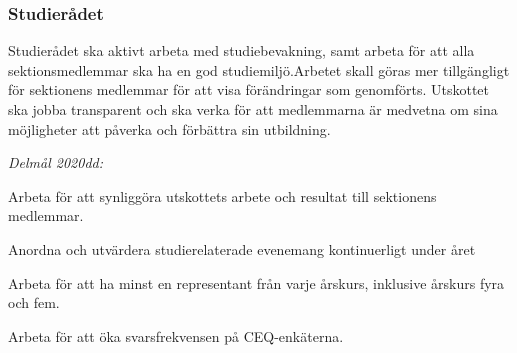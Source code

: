 \documentclass[../_main/handlingar.tex]{subfiles}
\begin{document}
\subsubsection*{Studierådet}
Studierådet ska aktivt arbeta med studiebevakning, samt arbeta för att alla sektionsmedlemmar ska ha en god studiemiljö.Arbetet skall göras mer tillgängligt för sektionens medlemmar för att visa förändringar som genomförts. Utskottet ska jobba transparent och ska verka för att medlemmarna är medvetna  om sina möjligheter att påverka och förbättra sin utbildning.

\emph{Delmål 2020dd:}
\begin{dashlist}
	\item Arbeta för att synliggöra utskottets arbete och resultat till sektionens medlemmar.
	\item Anordna och utvärdera studierelaterade evenemang kontinuerligt under året
	\item Arbeta för att ha minst en representant från varje årskurs, inklusive årskurs fyra och fem.
	\item Arbeta för att öka svarsfrekvensen på CEQ-enkäterna.
\end{dashlist}

\newpage
\end{document}
